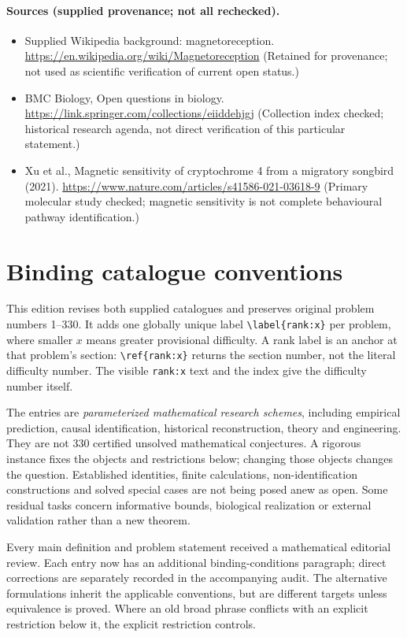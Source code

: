 \documentclass[11pt]{article}
\begin{document}
\paragraph{Sources (supplied provenance; not all rechecked).} \begin{itemize}
\item Supplied Wikipedia background: magnetoreception. \url{https://en.wikipedia.org/wiki/Magnetoreception} (Retained for provenance; not used as scientific verification of current open status.)
\item BMC Biology, Open questions in biology. \url{https://link.springer.com/collections/eiiddehjgj} (Collection index checked; historical research agenda, not direct verification of this particular statement.)
\item Xu et al., Magnetic sensitivity of cryptochrome 4 from a migratory songbird (2021). \url{https://www.nature.com/articles/s41586-021-03618-9} (Primary molecular study checked; magnetic sensitivity is not complete behavioural pathway identification.)
\end{itemize}


\section*{Binding catalogue conventions}
This edition revises both supplied catalogues and preserves original problem numbers 1--330. It adds one globally unique label \verb|\label{rank:x}| per problem, where smaller $x$ means greater provisional difficulty. A rank label is an anchor at that problem's section: \verb|\ref{rank:x}| returns the section number, not the literal difficulty number. The visible \texttt{rank:x} text and the index give the difficulty number itself.

The entries are \emph{parameterized mathematical research schemes}, including empirical prediction, causal identification, historical reconstruction, theory and engineering. They are not 330 certified unsolved mathematical conjectures. A rigorous instance fixes the objects and restrictions below; changing those objects changes the question. Established identities, finite calculations, non-identification constructions and solved special cases are not being posed anew as open. Some residual tasks concern informative bounds, biological realization or external validation rather than a new theorem.

Every main definition and problem statement received a mathematical editorial review. Each entry now has an additional binding-conditions paragraph; direct corrections are separately recorded in the accompanying audit. The alternative formulations inherit the applicable conventions, but are different targets unless equivalence is proved. Where an old broad phrase conflicts with an explicit restriction below it, the explicit restriction controls.
\end{document}
